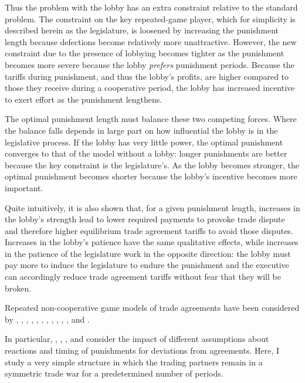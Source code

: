 \documentclass[authoryear, review]{elsarticle}
\begin{document}
Thus the problem with the lobby has an extra constraint relative to the standard problem. The constraint on the key repeated-game player, which for simplicity is described herein as the legislature, is loosened by increasing the punishment length because defections become relatively more unattractive. However, the new constraint due to the presence of lobbying becomes tighter as the punishment becomes more severe because the lobby \textit{prefers} punishment periods. Because the tariffs during punishment, and thus the lobby's profits, are higher compared to those they receive during a cooperative period, the lobby has increased incentive to exert effort as the punishment lengthens.

The optimal punishment length must balance these two competing forces. Where the balance falls depends in large part on how influential the lobby is in the legislative process. If the lobby has very little power, the optimal punishment converges to that of the model without a lobby: longer punishments are better because the key constraint is the legislature's. As the lobby becomes stronger, the optimal punishment becomes shorter because the lobby's incentive becomes more important.

Quite intuitively, it is also shown that, for a given punishment length, increases in the lobby's strength lead to lower required payments to provoke trade dispute and therefore higher equilibrium trade agreement tariffs to avoid those disputes. Increases in the lobby's patience have the same qualitative effects, while increases in the patience of the legislature work in the opposite direction: the lobby must pay more to induce the legislature to endure the punishment and the executive can accordingly reduce trade agreement tariffs without fear that they will be broken.

Repeated non-cooperative game models of trade agreements have been considered by \citet{mcm86,mcm89}, \citet{cotmitch}, \citet{dixit1987}, \citet{bs1990, bs1997a, bs1997b, bs2002}, \citet{kovthurs}, \citet{maggi99}, \citet{ederington}, \citet{ludema2001}, \citet{rosendorff}, \citet{krw}, \citet{bagwell2009}, and \citet{park}.

In particular, \citet{hungerford}, \citet{riezman1991}, \citet{cotmitch}, \citet{bagwell2008} and \citet{martinvergote} consider the impact of different assumptions about reactions and timing of punishments for deviations from agreements. Here, I study a very simple structure in which the trading partners remain in a symmetric trade war for a predetermined number of periods.
\end{document}
